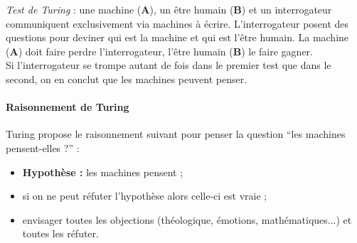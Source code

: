 \emph{Test de Turing} : une machine (\textbf{A}), un être humain (\textbf{B}) et un interrogateur communiquent exclusivement via machines à écrire. L'interrogateur posent des questions pour deviner qui est la machine et qui est l'être humain. La machine (\textbf{A}) doit faire perdre l'interrogateur, l'être humain (\textbf{B}) le faire gagner.\\

Si l'interrogateur se trompe autant de fois dans le premier test que dans le second, on en conclut que les machines peuvent penser.

\paragraph{Raisonnement de Turing}
Turing propose le raisonnement suivant pour penser la question ``les machines pensent-elles ?'' :
\begin{itemize}
	\item \textbf{Hypothèse :} les machines pensent ;
	\item si on ne peut réfuter l'hypothèse alors celle-ci est vraie ;
	\item envisager toutes les objections (théologique, émotions, mathématiques...) et toutes les réfuter.
\end{itemize}
